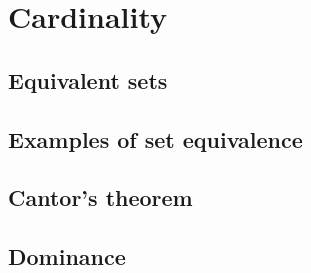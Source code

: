 \chapter{Cardinality}


\section{Equivalent sets}




\newpage

\section{Examples of set equivalence}




\newpage

\section{Cantor's theorem}




\newpage

\section{Dominance}






%
 

